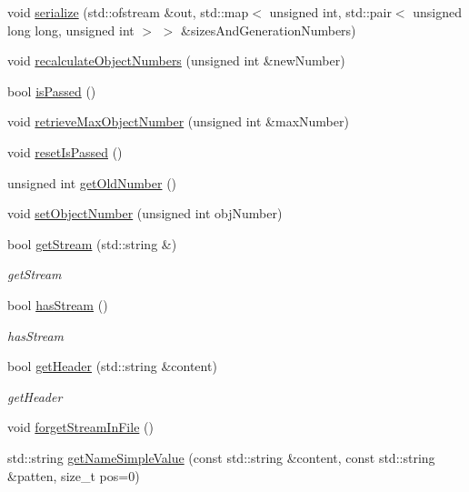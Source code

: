\begin{DoxyCompactItemize}
\item 
void \hyperlink{classmerge__lib_1_1_object_a90a2dd7c404c4cd275df87902d205337}{serialize} (std\-::ofstream \&out, std\-::map$<$ unsigned int, std\-::pair$<$ unsigned long long, unsigned int $>$ $>$ \&sizes\-And\-Generation\-Numbers)
\item 
void \hyperlink{classmerge__lib_1_1_object_a54aaa67b196c1ee3f75fcb2b5b45c4d7}{recalculate\-Object\-Numbers} (unsigned int \&new\-Number)
\item 
bool \hyperlink{classmerge__lib_1_1_object_a5e08d1a187878b9afaad16d0012e692f}{is\-Passed} ()
\item 
void \hyperlink{classmerge__lib_1_1_object_afdaeb3e503cd26fe09f0b1d30aadc7bc}{retrieve\-Max\-Object\-Number} (unsigned int \&max\-Number)
\item 
void \hyperlink{classmerge__lib_1_1_object_ac38e5117070fa0a81c46259e46f0b939}{reset\-Is\-Passed} ()
\item 
unsigned int \hyperlink{classmerge__lib_1_1_object_a17910ac5b37657f732f51b1bd312c5e0}{get\-Old\-Number} ()
\item 
void \hyperlink{classmerge__lib_1_1_object_a9bbbf5b5c86d929893bbf400a28e14c6}{set\-Object\-Number} (unsigned int obj\-Number)
\item 
bool \hyperlink{classmerge__lib_1_1_object_a771b0f03b96250a9f814d4021f558a9a}{get\-Stream} (std\-::string \&)
\begin{DoxyCompactList}\small\item\em get\-Stream \end{DoxyCompactList}\item 
bool \hyperlink{classmerge__lib_1_1_object_a42a15267894aa3119b5eb5e389c705fa}{has\-Stream} ()
\begin{DoxyCompactList}\small\item\em has\-Stream \end{DoxyCompactList}\item 
bool \hyperlink{classmerge__lib_1_1_object_a439a2b34f5e9480a36c299e30be0f6f7}{get\-Header} (std\-::string \&content)
\begin{DoxyCompactList}\small\item\em get\-Header \end{DoxyCompactList}\item 
void \hyperlink{classmerge__lib_1_1_object_a352c4cacaa4efa997c96f64273862b8a}{forget\-Stream\-In\-File} ()
\item 
std\-::string \hyperlink{classmerge__lib_1_1_object_a74d6f1dd66a4371682ecb1415e61e818}{get\-Name\-Simple\-Value} (const std\-::string \&content, const std\-::string \&patten, size\-\_\-t pos=0)

\end{DoxyCompactItemize}
